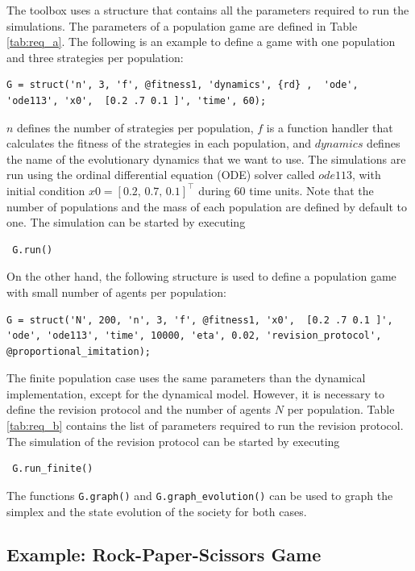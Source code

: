 The toolbox uses a structure that contains all the parameters required to run the simulations. The parameters of a population game are defined in Table \ref{tab:req_a}. The following is an example to define a game with one population and three strategies per population:
%
\begin{lstlisting}
G = struct('n', 3, 'f', @fitness1, 'dynamics', {rd} ,  'ode', 'ode113', 'x0',  [0.2 .7 0.1 ]', 'time', 60);
\end{lstlisting}
%
$n$ defines the number of strategies per population, $f$ is a function handler that calculates the fitness of the strategies in each population, and $dynamics$ defines the name of the evolutionary dynamics that we want to use. The simulations are run using the ordinal differential equation (ODE) solver called $ode113$, with initial condition $x0 = [0.2, \, 0.7, \, 0.1 ]^\top$ during $60$ time units.
Note that the number of populations and the mass of each population are defined by default to one.  The simulation can be started by executing
%
\begin{lstlisting}
 G.run()
\end{lstlisting}




On the other hand, the following structure is used to define a population game with small number of agents per population:
%
\begin{lstlisting}
G = struct('N', 200, 'n', 3, 'f', @fitness1, 'x0',  [0.2 .7 0.1 ]', 'ode', 'ode113', 'time', 10000, 'eta', 0.02, 'revision_protocol', @proportional_imitation); 
\end{lstlisting}
%
The finite population case uses the same parameters than the dynamical implementation, except for the dynamical model. However, it is necessary to define the revision protocol  and the number of agents $N$ per population.
Table \ref{tab:req_b} contains the list of parameters required to run the revision protocol. The simulation of the revision protocol can be started by executing
\begin{lstlisting}
 G.run_finite()
\end{lstlisting}

The functions \verb|G.graph()| and \verb|G.graph_evolution()| can be used to graph the simplex and the state evolution of the society for both cases.



\subsection{Example: Rock-Paper-Scissors Game}




